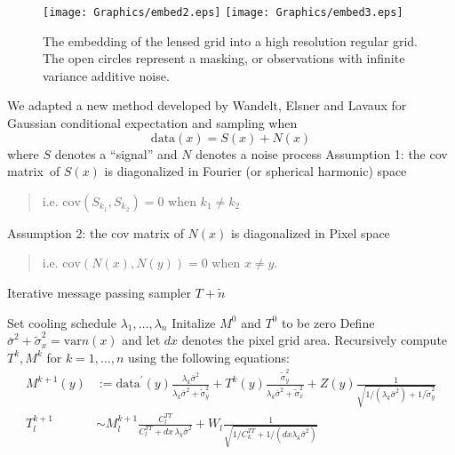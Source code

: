 \documentclass[noinfoline]{imsart}
\begin{document}
\begin{figure}[H]
{\texttt{[image: Graphics/embed2.eps]}}%
{\texttt{[image: Graphics/embed3.eps]}}
\caption{The embedding of the lensed grid into a high resolution regular grid. The open circles represent a masking, or observations with infinite variance additive noise.}
\label{embed}
\end{figure}





 We adapted a new method developed by Wandelt, Elsner and Lavaux for Gaussian conditional expectation and sampling when
\[\text{data}(x) = S(x)  + N(x) \]
where $S$ denotes a ``signal'' and $N$ denotes a noise process
 Assumption 1: the cov matrix~of $S(x)$ is diagonalized in Fourier (or spherical harmonic) space
\begin{quote}
i.e. $\text{cov}(S_{k_1}, S_{k_2})= 0$ when $k_1 \neq k_2$
\end{quote}  Assumption 2: the cov matrix of $N(x)$ is diagonalized in Pixel space
\begin{quote}
i.e. $\text{cov}(N(x), N(y))= 0$ when $x \neq y$.
\end{quote}





\begin{algorithm}[H]
\small
\caption{Iterative message passing sampler  $ T + \tilde n$}
\label{ith step of HMC}
\begin{algorithmic}[1]
\State Set cooling schedule $\lambda_1, \ldots, \lambda_n$
\State Initalize $M^0$ and $T^0$  to be zero
\State Define $\bar\sigma^2 + \tilde\sigma_x^{2} = \text{var} n(x)$ and let $dx$ denotes the pixel grid area. 
\State Recursively compute $T^k, M^k$ for $k=1, \ldots, n$ using the following equations:
\begin{align}
M^{k+1}(y)&:=\text{data}^\prime(y)\frac{\lambda_k\bar\sigma^{2}}{\lambda_k\bar\sigma^2 + \tilde \sigma_y^2} + T^k(y)\frac{\tilde\sigma_y^{2}}{\lambda_k\bar\sigma^2 + \tilde \sigma_x^2}  + Z(y) \frac{1}{\sqrt{1/(\lambda_k\bar\sigma^{2}) + 1/\tilde\sigma_y^{2}}} \\
T^{k+1}_l & \sim M_l^{k+1}\frac{C^{TT}_l}{C^{TT}_l + dx \, \lambda_k\bar\sigma^2} + W_l
\frac{1}{\sqrt{1/C^{TT}_k + 1/(dx \lambda_k\bar\sigma^2)}} 
\end{align}
\end{algorithmic}
\end{algorithm}
\end{document}
